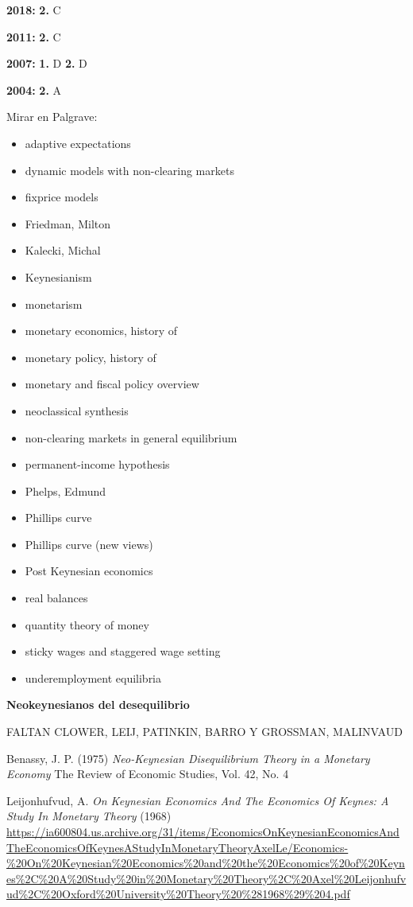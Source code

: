 \documentclass{nuevotema}
\begin{document}
\textbf{2018:} \textbf{2.} C

\textbf{2011:} \textbf{2.} C

\textbf{2007:} \textbf{1.} D \textbf{2.} D

\textbf{2004:} \textbf{2.} A

\bibliografia

Mirar en Palgrave:
\begin{itemize}
	\item adaptive expectations
	\item dynamic models with non-clearing markets
	\item fixprice models
	\item Friedman, Milton
	\item Kalecki, Michal
	\item Keynesianism
	\item monetarism
	\item monetary economics, history of
	\item monetary policy, history of
	\item monetary and fiscal policy overview
	\item neoclassical synthesis
	\item non-clearing markets in general equilibrium
	\item permanent-income hypothesis
	\item Phelps, Edmund
	\item Phillips curve
	\item Phillips curve (new views)
	\item Post Keynesian economics
	\item real balances
	\item quantity theory of money
	\item sticky wages and staggered wage setting
	\item underemployment equilibria
\end{itemize}

\textbf{{\large Neokeynesianos del desequilibrio}}


FALTAN CLOWER, LEIJ, PATINKIN, BARRO Y GROSSMAN, MALINVAUD

Benassy, J. P. (1975) \textit{Neo-Keynesian Disequilibrium Theory in a Monetary Economy} The Review of Economic Studies, Vol. 42, No. 4

Leijonhufvud, A. \textit{On Keynesian Economics And The Economics Of Keynes: A Study In Monetary Theory} (1968) \url{https://ia600804.us.archive.org/31/items/EconomicsOnKeynesianEconomicsAndTheEconomicsOfKeynesAStudyInMonetaryTheoryAxelLe/Economics-\%20On\%20Keynesian\%20Economics\%20and\%20the\%20Economics\%20of\%20Keynes\%2C\%20A\%20Study\%20in\%20Monetary\%20Theory\%2C\%20Axel\%20Leijonhufvud\%2C\%20Oxford\%20University\%20Theory\%20\%281968\%29\%204.pdf}
\end{document}
